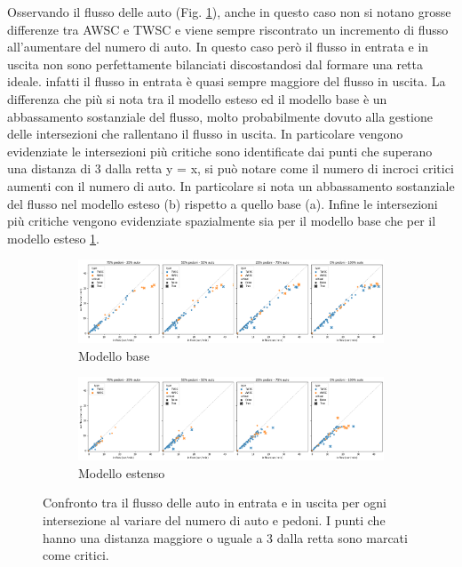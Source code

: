 Osservando il flusso delle auto (Fig. \ref{fig:analisi-comparison-in-out-flow-car}), anche in questo caso
non si notano grosse differenze tra AWSC e TWSC e viene sempre riscontrato un incremento di flusso all'aumentare del numero di auto.
In questo caso però il flusso in entrata e in uscita non sono perfettamente bilanciati discostandosi dal formare una retta ideale.
infatti il flusso in entrata è quasi sempre maggiore del flusso in uscita.
La differenza che più si nota tra il modello esteso ed il modello base è un abbassamento sostanziale del flusso,
molto probabilmente dovuto alla gestione delle intersezioni che rallentano il flusso in uscita.
In particolare vengono evidenziate le intersezioni più critiche sono identificate dai punti che superano una distanza di 3 dalla retta y = x,
si può notare come il numero di incroci critici aumenti con il numero di auto.
In particolare si nota un abbassamento sostanziale del flusso nel modello esteso (b)
rispetto a quello base (a).
Infine le intersezioni più critiche vengono evidenziate spazialmente sia per il modello base 
che per il modello esteso \ref{fig:analisi-comparison-in-out-flow-car}.

\begin{figure}[ht]
    \centering
    \begin{subfigure}{0.9\textwidth}
        \centering
        \includegraphics[width=\textwidth]{images/analisi/comparison-base-in-out-flow-car.png}
        \caption{Modello base}
    \end{subfigure}
    \hfill
    \begin{subfigure}{0.9\textwidth}
        \centering
        \includegraphics[width=\textwidth]{images/analisi/comparison-new-in-out-flow-car.png}
        \caption{Modello estenso}
    \end{subfigure}
    \caption{
        Confronto tra il flusso delle auto in entrata e in uscita per ogni intersezione al variare del numero di auto e pedoni.
        I punti che hanno una distanza maggiore o uguale a 3 dalla retta sono marcati come critici.
    }
    \label{fig:analisi-comparison-in-out-flow-car}
\end{figure}


